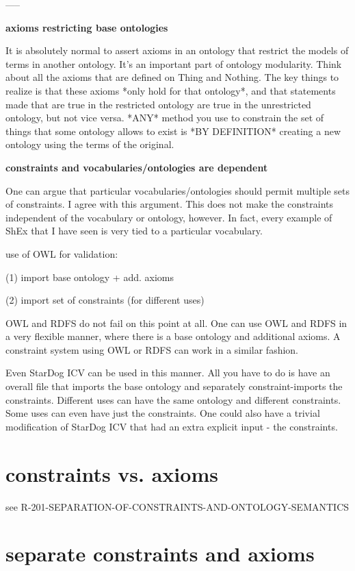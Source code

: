 \documentclass{llncs}
\begin{document}
-----

\textbf{axioms restricting base ontologies}

It is absolutely normal to assert axioms in an ontology that restrict the models of terms in another ontology. It's an important part of ontology modularity.
Think about all the axioms that are defined on Thing and Nothing.
The key things to realize is that these axioms *only hold for that ontology*, and that statements made that are true in the restricted ontology are true in the unrestricted ontology, but not vice versa.  
*ANY* method you use to constrain the set of things that some ontology allows to exist is *BY DEFINITION* creating a new ontology using the terms of the original.

\textbf{constraints and vocabularies/ontologies are dependent}

One can argue that particular vocabularies/ontologies should permit multiple sets of constraints.  I agree with this argument.  This does not make the constraints independent of the vocabulary or ontology, however.  In fact, every example of ShEx that I have seen is very tied to a particular vocabulary.

use of OWL for validation:

(1) import base ontology + add. axioms

(2) import set of constraints (for different uses)

OWL and RDFS do not fail on this point at all.  One can use OWL and RDFS in a very flexible manner, where there is a base ontology and additional axioms.  A constraint system using OWL or RDFS can work in a similar fashion.

Even StarDog ICV can be used in this manner.  All you have to do is have an overall file that imports the base ontology and separately constraint-imports the constraints.  Different uses can have the same ontology and different constraints.  Some uses can even have just the constraints.  One could also have a trivial modification of StarDog ICV that had an extra explicit input - the constraints.

\section{constraints vs. axioms}

see R-201-SEPARATION-OF-CONSTRAINTS-AND-ONTOLOGY-SEMANTICS

\section{separate constraints and axioms}
\end{document}
